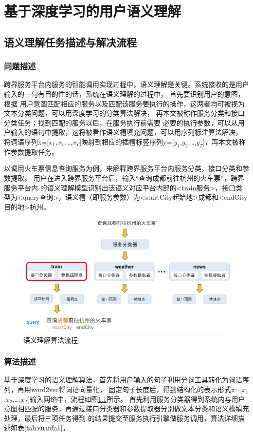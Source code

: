 \chapter{基于深度学习的用户语义理解}

\section{语义理解任务描述与解决流程}
\subsection{问题描述}
跨界服务平台内服务的智能调用实现过程中，语义理解是关键。系统接收的是用户输入的一句有目的性的话，系统在语义理解的过程中，
首先要识别用户的意图，根据
用户意图匹配相应的服务以及匹配该服务要执行的操作，这两者均可被视为文本分类问题，可以用深度学习的分类算法解决，
再本文被称作服务分类和接口分类任务；找到匹配的服务以后，在服务执行前需要
必要的执行参数，可以从用户输入的语句中提取，这将被看作语义槽填充问题，可以用序列标注算法解决，
将词语序列x=[$x_{1}$,$x_{2}$,\dots,$x_{T}$]映射到相应的插槽标签序列y=[$y_{1}$,$y_{2}$,\dots,$y_{T}$]，再本文被称作参数提取任务。

以调用火车票信息查询服务为例，来解释跨界服务平台内服务分类，接口分类和参数提取。
用户在进入跨界服务平台后，输入“查询成都前往杭州的火车票”，跨界服务平台内
的语义理解模型识别出该语义对应平台内部的<train服务>，接口类型为<query查询>，语义槽（即服务参数）为<startCity起始地>成都和<endCity目的地>杭州。


\begin{figure}[htbp]
    \centering
    \includegraphics[scale=0.5]{./images/liucheng.png}
    \caption{语义理解算法流程}
    \label{fig:questiondesc}
  \end{figure}

\subsection{算法描述}
基于深度学习的语义理解算法，首先将用户输入的句子利用分词工具转化为词语序列，再用word2vec将词语向量化，
固定句子长度后，得到结构化的表示形式x=[$x_{1}$,$x_{2}$,\dots,$x_{T}$]输入网络中，流程如图\ref{fig:questiondesc}所示。
首先利用服务分类器得到系统内与用户意图相匹配的服务，再通过接口分类器和参数提取器分别做文本分类和语义槽填充处理，最后将三项任务得到
的结果提交至服务执行引擎做服务调用，算法详细描述如表\ref{tab:suanfa1}。


